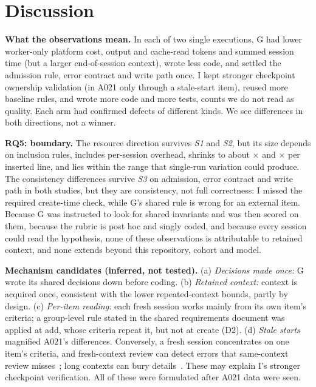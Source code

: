 \documentclass[10pt,conference]{IEEEtran}
\newcommand{\G}{G}
\newcommand{\I}{I}
\begin{document}
\section{Discussion}\label{sec:discussion}

\textbf{What the observations mean.} In each of two single executions, \G{} had lower worker-only platform cost, output and cache-read tokens and summed session time (but a larger end-of-session context), wrote less code, and settled the admission rule, error contract and write path once. \I{} kept stronger checkpoint ownership validation (in A021 only through a stale-start item), reused more baseline rules, and wrote more code and more tests, counts we do not read as quality. Each arm had confirmed defects of different kinds. We see differences in both directions, not a winner. %

\textbf{RQ5: boundary.} The resource direction survives \emph{S1} and \emph{S2}, but its size depends on inclusion rules, includes per-session overhead, shrinks to about \AcostPerLineRatio$\times$ and \RtwoCostPerLineRatio$\times$ per inserted line, and lies within the range that single-run variation could produce. The consistency differences survive \emph{S3} on admission, error contract and write path in both studies, but they are consistency, not full correctness: \I{} missed the required create-time check, while \G's shared rule is wrong for an external item. Because \G{} was instructed to look for shared invariants and was then scored on them, because the rubric is post hoc and singly coded, and because every session could read the hypothesis, none of these observations is attributable to retained context, and none extends beyond this repository, cohort and model. %

\textbf{Mechanism candidates (inferred, not tested).} (a) \emph{Decisions made once:} \G{} wrote its shared decisions down before coding. (b) \emph{Retained context:} context is acquired once, consistent with the lower repeated-context bounds, partly by design. (c) \emph{Per-item reading:} each fresh session works mainly from its own item's criteria; a group-level rule stated in the shared requirements document was applied at add, whose criteria repeat it, but not at create (D2). (d) \emph{Stale starts} magnified A021's differences. Conversely, a fresh session concentrates on one item's criteria, and fresh-context review can detect errors that same-context review misses~\cite{song2026crosscontext}; long contexts can bury details~\cite{liu2024lost}. These may explain \I's stronger checkpoint verification. All of these were formulated after A021 data were seen. %
\end{document}
